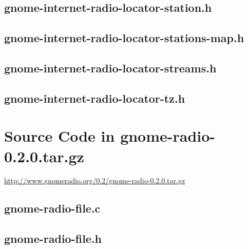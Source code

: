 \documentclass[a4paper,norsk,utf8]{report}
\begin{document}


\section{gnome-internet-radio-locator-station.h}



\section{gnome-internet-radio-locator-stations-map.h}



\section{gnome-internet-radio-locator-streams.h}



\section{gnome-internet-radio-locator-tz.h}



\chapter{Source Code in gnome-radio-0.2.0.tar.gz}

\url{http://www.gnomeradio.org/0.2/gnome-radio-0.2.0.tar.gz}

\section{gnome-radio-file.c}



\section{gnome-radio-file.h}


\end{document}
